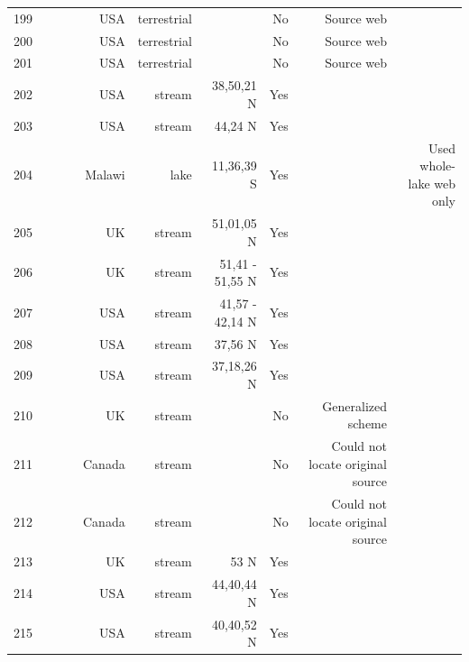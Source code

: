 \documentclass[12pt]{article}
\begin{document}
\begin{landscape}
\begin{table}[h!]
\begin{tabular}{rrrrrrrrr}
      199   & ~\citet{GlobalWeb} & ~\citet{Valiela1969} & USA   & terrestrial &       & No    & Source web &  \\
      200   & ~\citet{GlobalWeb} & ~\citet{Valiela1974} & USA   & terrestrial &       & No    & Source web &  \\
      201   & ~\citet{GlobalWeb} & ~\citet{Valiela1974} & USA   & terrestrial &       & No    & Source web &  \\
      202   & ~\citet{GlobalWeb} & ~\citet{Allan1982} & USA   & stream & 38,50,21 N & Yes   &       &  \\
      203   & ~\citet{GlobalWeb} & ~\citet{Collins1976} & USA   & stream & 44,24 N & Yes   &       &  \\
      204   & ~\citet{GlobalWeb} & ~\citet{Fryer1959} & Malawi & lake  & 11,36,39 S & Yes   &       & Used whole-lake web only \\
      205   & ~\citet{GlobalWeb} & ~\citet{Hildrew1985} & UK    & stream & 51,01,05 N & Yes   &       &  \\
      206   & ~\citet{GlobalWeb} & ~\citet{Jones1949} & UK    & stream & 51,41 - 51,55 N & Yes   &       &  \\
      207   & ~\citet{GlobalWeb} & ~\citet{Koslucher1973} & USA   & stream & 41,57 - 42,14 N & Yes   &       &  \\
      208   & ~\citet{GlobalWeb} & ~\citet{Minckley1963} & USA   & stream & 37,56 N & Yes   &       &  \\
      209   & ~\citet{GlobalWeb} & ~\citet{Minshall1967} & USA   & stream & 37,18,26 N & Yes   &       &  \\
      210   & ~\citet{GlobalWeb} & ~\citet{Percival1929} & UK    & stream &       & No    & Generalized scheme &  \\
      211   & ~\citet{GlobalWeb} & ~\citet{Ricker1935} & Canada & stream &       & No    & Could not locate original source &  \\
      212   & ~\citet{GlobalWeb} & ~\citet{Ricker1935} & Canada & stream &       & No    & Could not locate original source &  \\
      213   & ~\citet{GlobalWeb} & ~\citet{Badcock1949} & UK    & stream & 53 N  & Yes   &       &  \\
      214   & ~\citet{GlobalWeb} & ~\citet{Thompson2003} & USA   & stream & 44,40,44 N & Yes   &       &  \\
      215   & ~\citet{GlobalWeb} & ~\citet{Thompson2003} & USA   & stream & 40,40,52 N & Yes   &       &  \\

\end{tabular}
\end{table}
\end{landscape}
\end{document}
